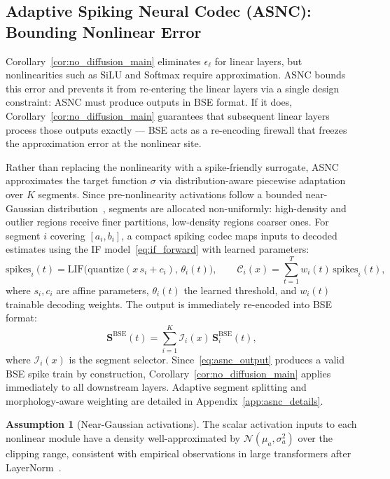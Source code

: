 \documentclass{article}
\theoremstyle{plain}
\theoremstyle{definition}
\newtheorem{assumption}[theorem]{Assumption}
\theoremstyle{remark}
\begin{document}
\subsection{Adaptive Spiking Neural Codec (ASNC): Bounding Nonlinear Error}
\label{subsec:asnc}

Corollary~\ref{cor:no_diffusion_main} eliminates $\epsilon_\ell$ for linear layers, but nonlinearities such as SiLU and Softmax require approximation. ASNC bounds this error and prevents it from re-entering the linear layers via a single design constraint: ASNC must produce outputs in BSE format. If it does, Corollary~\ref{cor:no_diffusion_main} guarantees that subsequent linear layers process those outputs exactly — BSE acts as a re-encoding firewall that freezes the approximation error at the nonlinear site.

Rather than replacing the nonlinearity with a spike-friendly surrogate, ASNC approximates the target function $\sigma$ via distribution-aware piecewise adaptation over $K$ segments. Since pre-nonlinearity activations follow a bounded near-Gaussian distribution~\citep{he2024understanding,lin2024duquant}, segments are allocated non-uniformly: high-density and outlier regions receive finer partitions, low-density regions coarser ones. For segment $i$ covering $[a_i, b_i]$, a compact spiking codec maps inputs to decoded estimates using the IF model~\eqref{eq:if_forward} with learned parameters:
\begin{equation}
\label{eq:asnc_codec}
\mathrm{spikes}_i(t)
  = \mathrm{LIF}\!\bigl(\mathrm{quantize}(x\,s_i + c_i),\,\theta_i(t)\bigr),
\qquad
\mathcal{C}_i(x) = \sum_{t=1}^{T} w_i(t)\,\mathrm{spikes}_i(t),
\end{equation}
where $s_i, c_i$ are affine parameters, $\theta_i(t)$ the learned threshold, and $w_i(t)$ trainable decoding weights. The output is immediately re-encoded into BSE format:
\begin{equation}
\label{eq:asnc_output}
\mathbf{S}^{\mathrm{BSE}}(t)
  = \sum_{i=1}^{K} \mathcal{I}_i(x)\,\mathbf{S}^{\mathrm{BSE}}_i(t),
\end{equation}
where $\mathcal{I}_i(x)$ is the segment selector. Since~\eqref{eq:asnc_output} produces a valid BSE spike train by construction, Corollary~\ref{cor:no_diffusion_main} applies immediately to all downstream layers. Adaptive segment splitting and morphology-aware weighting are detailed in Appendix~\ref{app:asnc_details}.

\begin{assumption}[Near-Gaussian activations]
\label{asm:gaussian_activations}
The scalar activation inputs to each nonlinear module have a density well-approximated by $\mathcal{N}(\mu_a, \sigma_a^2)$ over the clipping range, consistent with empirical observations in large transformers after LayerNorm~\citep{he2024understanding,lin2024duquant}.
\end{assumption}
\end{document}
